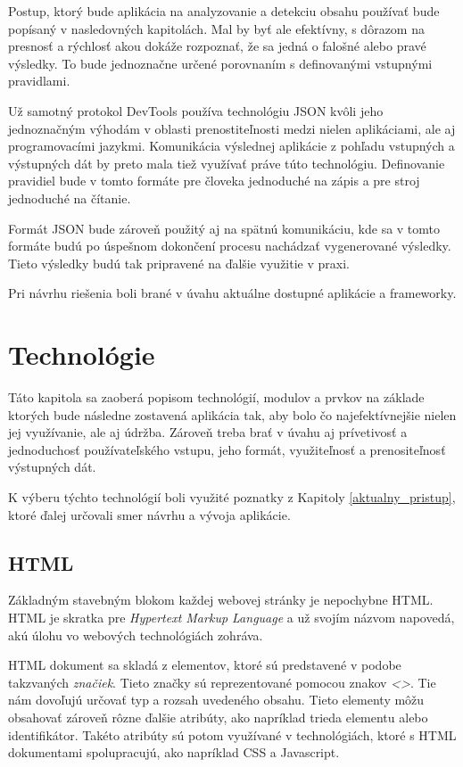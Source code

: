 Postup, ktorý bude aplikácia na analyzovanie a detekciu obsahu používať bude popísaný v nasledovných kapitolách. Mal by byť ale efektívny, s dôrazom na presnosť a rýchlosť akou dokáže rozpoznať, že sa jedná o falošné alebo pravé výsledky. To bude jednoznačne určené porovnaním s definovanými vstupnými pravidlami.

\bigskip

Už samotný protokol DevTools používa technológiu JSON kvôli jeho jednoznačným výhodám v oblasti prenostiteľnosti medzi nielen aplikáciami, ale aj programovacími jazykmi. Komunikácia výslednej aplikácie z pohľadu vstupných a výstupných dát by preto mala tiež využívať práve túto technológiu. Definovanie pravidiel bude v tomto formáte pre človeka jednoduché na zápis a pre stroj jednoduché na čítanie. 

Formát JSON bude zároveň použitý aj na spätnú komunikáciu, kde sa v tomto formáte budú po úspešnom dokončení procesu nachádzať vygenerované výsledky. Tieto výsledky budú tak pripravené na ďalšie využitie v praxi.

Pri návrhu riešenia boli brané v úvahu aktuálne dostupné aplikácie a frameworky. 


\chapter{Technológie}
\label{Technologie}

Táto kapitola sa zaoberá popisom technológií, modulov a prvkov na základe ktorých bude následne zostavená aplikácia tak, aby bolo čo najefektívnejšie nielen jej využívanie, ale aj údržba. Zároveň treba brať v úvahu aj prívetivosť a jednoduchosť používateľského vstupu, jeho formát, využiteľnosť a prenositeľnosť výstupných dát. 

K výberu týchto technológií boli využité poznatky z Kapitoly \ref{aktualny_pristup}, ktoré ďalej určovali smer návrhu a vývoja aplikácie.

\section{HTML}

Základným stavebným blokom každej webovej stránky je nepochybne HTML. HTML je skratka pre \textit{Hypertext Markup Language} a už svojím názvom napovedá, akú úlohu vo webových technológiách zohráva. 

HTML dokument sa skladá z elementov, ktoré sú predstavené v podobe takzvaných \textit{značiek}. Tieto značky sú reprezentované pomocou znakov \textit{<>}. Tie nám dovoľujú určovať typ a rozsah uvedeného obsahu. Tieto elementy môžu obsahovať zároveň rôzne ďalšie atribúty, ako napríklad trieda elementu alebo identifikátor. Takéto atribúty sú potom využívané v technológiách, ktoré s HTML dokumentami spolupracujú, ako napríklad CSS a Javascript.

